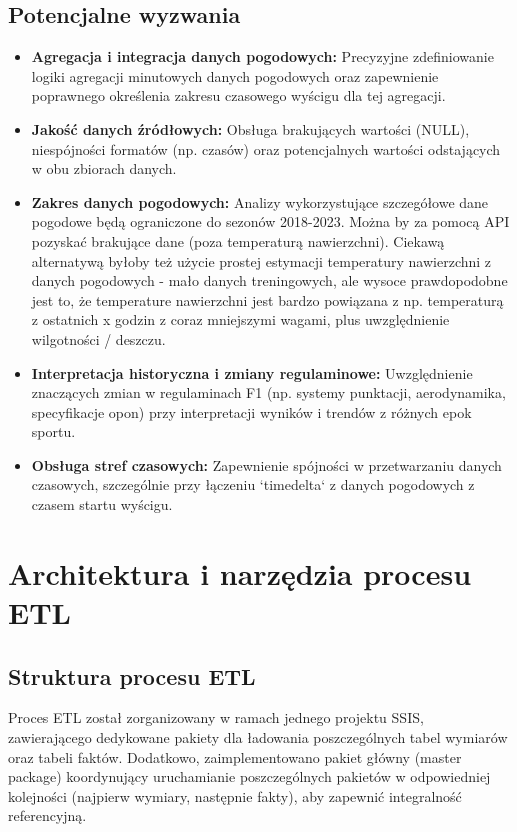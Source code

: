 \documentclass[a4paper,12pt]{article}
\begin{document}
\subsection{Potencjalne wyzwania}
\begin{itemize}[label=\textbullet, leftmargin=*]
  \item \textbf{Agregacja i integracja danych pogodowych:} Precyzyjne zdefiniowanie logiki agregacji minutowych danych pogodowych oraz zapewnienie poprawnego określenia zakresu czasowego wyścigu dla tej agregacji.
  \item \textbf{Jakość danych źródłowych:} Obsługa brakujących wartości (NULL), niespójności formatów (np. czasów) oraz potencjalnych wartości odstających w obu zbiorach danych.
  \item \textbf{Zakres danych pogodowych:} Analizy wykorzystujące szczegółowe dane pogodowe będą ograniczone do sezonów 2018-2023. Można by za pomocą API pozyskać brakujące dane (poza temperaturą nawierzchni). Ciekawą alternatywą byłoby też użycie prostej estymacji temperatury nawierzchni z danych pogodowych - mało danych treningowych, ale wysoce prawdopodobne jest to, że temperature nawierzchni jest bardzo powiązana z np. temperaturą z ostatnich x godzin z coraz mniejszymi wagami, plus uwzględnienie wilgotności / deszczu.
  \item \textbf{Interpretacja historyczna i zmiany regulaminowe:} Uwzględnienie znaczących zmian w regulaminach F1 (np. systemy punktacji, aerodynamika, specyfikacje opon) przy interpretacji wyników i trendów z różnych epok sportu.
  \item \textbf{Obsługa stref czasowych:} Zapewnienie spójności w przetwarzaniu danych czasowych, szczególnie przy łączeniu `timedelta` z danych pogodowych z czasem startu wyścigu.
\end{itemize}

\section{Architektura i narzędzia procesu ETL}

\subsection{Struktura procesu ETL}
Proces ETL został zorganizowany w ramach jednego projektu SSIS, zawierającego dedykowane pakiety dla ładowania poszczególnych tabel wymiarów oraz tabeli faktów. Dodatkowo, zaimplementowano pakiet główny (master
package) koordynujący uruchamianie poszczególnych pakietów w odpowiedniej kolejności (najpierw wymiary, następnie fakty), aby zapewnić integralność referencyjną.
\end{document}
